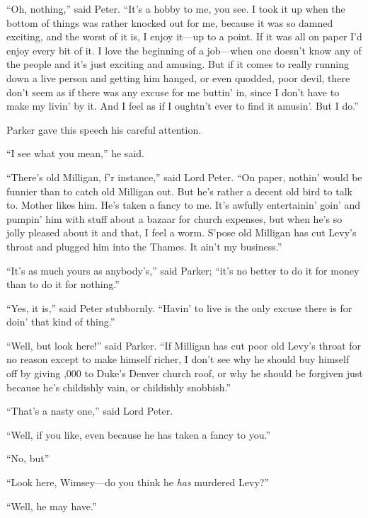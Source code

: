 \enquote{Oh, nothing,} said Peter. \enquote{It’s a hobby to me, you see. I took it up when the bottom of things was rather knocked out for me, because it was so damned exciting, and the worst of it is, I enjoy it\allowbreak---\allowbreak up to a point. If it was all on paper I’d enjoy every bit of it. I love the beginning of a job\allowbreak---\allowbreak when one doesn’t know any of the people and it’s just exciting and amusing. But if it comes to really running down a live person and getting him hanged, or even quodded, poor devil, there don’t seem as if there was any excuse for me buttin’ in, since I don’t have to make my livin’ by it. And I feel as if I oughtn’t ever to find it amusin’. But I do.}

Parker gave this speech his careful attention.

\enquote{I see what you mean,} he said.

\enquote{There’s old Milligan, f’r instance,} said Lord Peter. \enquote{On paper, nothin’ would be funnier than to catch old Milligan out. But he’s rather a decent old bird to talk to. Mother likes him. He’s taken a fancy to me. It’s awfully entertainin’ goin’ and pumpin’ him with stuff about a bazaar for church expenses, but when he’s so jolly pleased about it and that, I feel a worm. S’pose old Milligan has cut Levy’s throat and plugged him into the Thames. It ain’t my business.}

\enquote{It’s as much yours as anybody’s,} said Parker; \enquote{it’s no better to do it for money than to do it for nothing.}

\enquote{Yes, it is,} said Peter stubbornly. \enquote{Havin’ to live is the only excuse there is for doin’ that kind of thing.}

\enquote{Well, but look here!} said Parker. \enquote{If Milligan has cut poor old Levy’s throat for no reason except to make himself richer, I don’t see why he should buy himself off by giving ,000 to Duke’s Denver church roof, or why he should be forgiven just because he’s childishly vain, or childishly snobbish.}

\enquote{That’s a nasty one,} said Lord Peter.

\enquote{Well, if you like, even because he has taken a fancy to you.}

\enquote{No, but\longdash}

\enquote{Look here, Wimsey\allowbreak---\allowbreak do you think he \textit{has} murdered Levy?}

\enquote{Well, he may have.}

